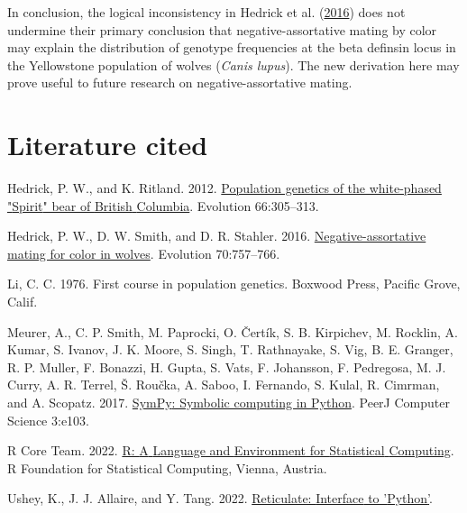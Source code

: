 \documentclass[
]{article}
\newlength{\cslhangindent}
\newlength{\cslentryspacingunit} %
\newenvironment{CSLReferences}[2] %
 {%
  \setlength{\parindent}{0pt}
  \ifodd #1
  \let\oldpar\par
  \def\par{\hangindent=\cslhangindent\oldpar}
  \fi
  \setlength{\parskip}{#2\cslentryspacingunit}
 }%
 {}
\begin{document}
In conclusion, the logical inconsistency in Hedrick et al. (\protect\hyperlink{ref-hedrick_negative-assortative_2016}{2016}) does not undermine their primary conclusion that negative-assortative mating by color may explain the distribution of genotype frequencies at the beta definsin locus in the Yellowstone population of wolves (\emph{Canis lupus}). The new derivation here may prove useful to future research on negative-assortative mating.

\hypertarget{literature-cited}{%
\section*{Literature cited}\label{literature-cited}}

\hypertarget{refs}{}
\begin{CSLReferences}{1}{0}
\leavevmode{}%
Hedrick, P. W., and K. Ritland. 2012. \href{https://doi.org/10.1111/j.1558-5646.2011.01463.x}{Population genetics of the white-phased "{Spirit}" bear of {British} {Columbia}}. Evolution 66:305--313.

\leavevmode{}%
Hedrick, P. W., D. W. Smith, and D. R. Stahler. 2016. \href{https://doi.org/10.1111/evo.12906}{Negative-assortative mating for color in wolves}. Evolution 70:757--766.

\leavevmode{}%
Li, C. C. 1976. First course in population genetics. Boxwood Press, Pacific Grove, Calif.

\leavevmode{}%
Meurer, A., C. P. Smith, M. Paprocki, O. Čertík, S. B. Kirpichev, M. Rocklin, A. Kumar, S. Ivanov, J. K. Moore, S. Singh, T. Rathnayake, S. Vig, B. E. Granger, R. P. Muller, F. Bonazzi, H. Gupta, S. Vats, F. Johansson, F. Pedregosa, M. J. Curry, A. R. Terrel, Š. Roučka, A. Saboo, I. Fernando, S. Kulal, R. Cimrman, and A. Scopatz. 2017. \href{https://doi.org/10.7717/peerj-cs.103}{{SymPy}: Symbolic computing in {Python}}. PeerJ Computer Science 3:e103.

\leavevmode{}%
R Core Team. 2022. \href{http://www.R-project.org/}{R: {A} {Language} and {Environment} for {Statistical} {Computing}}. R Foundation for Statistical Computing, Vienna, Austria.

\leavevmode{}%
Ushey, K., J. J. Allaire, and Y. Tang. 2022. \href{https://CRAN.R-project.org/package=reticulate}{Reticulate: {Interface} to '{Python}'}.

\end{CSLReferences}
\end{document}
